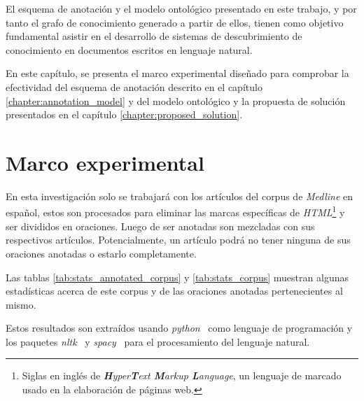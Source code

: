 \label{chapter:analysis_of_results}

\setcounter{footnote}{5}

El esquema de anotación y el modelo ontológico presentado en este trabajo, y por tanto el grafo de conocimiento generado a partir de ellos, tienen como objetivo fundamental asistir en el desarrollo de sistemas de descubrimiento de conocimiento en documentos escritos en lenguaje natural.

En este capítulo, se presenta el marco experimental diseñado para comprobar la efectividad del esquema de anotación descrito en el capítulo \ref{chapter:annotation_model} y del modelo ontológico y la propuesta de solución presentados en el capítulo \ref{chapter:proposed_solution}.

\section{Marco experimental}
En esta investigación solo se trabajará con los artículos del corpus de \textit{Medline} en español, estos son procesados para eliminar las marcas específicas de \textit{HTML}\footnote{Siglas en inglés de \textit{\textbf{H}yper\textbf{T}ext \textbf{M}arkup \textbf{L}anguage}, un lenguaje de marcado usado en la elaboración de páginas web.} y ser divididos en oraciones. Luego de ser anotadas son mezcladas con sus respectivos artículos. Potencialmente, un artículo podrá no tener ninguna de sus oraciones anotadas o estarlo completamente.

Las tablas \ref{tab:stats_annotated_corpus} y \ref{tab:stats_corpus} muestran algunas estadísticas acerca de este corpus y de las oraciones anotadas pertenecientes al mismo.

Estos resultados son extraídos usando \textit{python}~\cite{ref:22} como lenguaje de programación y los paquetes \textit{nltk}~\cite{ref:23} y \textit{spacy}~\cite{ref:24} para el procesamiento del lenguaje natural.

